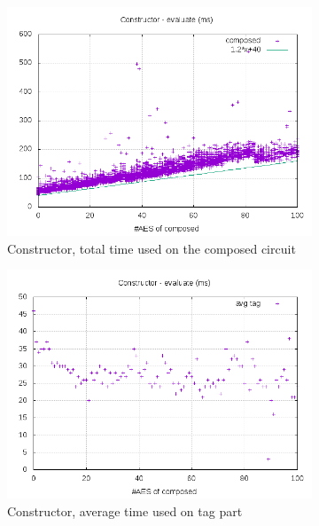 \documentclass[10pt,a4paper]{article}
\begin{document}
\begin{figure}[h]
    \centering
    \begin{subfigure}[t]{0.3\textwidth}
        \includegraphics[width=\textwidth]{const_eval_plots}
        \caption{Constructor, total time used on the composed circuit}
    \end{subfigure}
    \begin{subfigure}[t]{0.3\textwidth}
        \includegraphics[width=\textwidth]{const_eval_avg}
        \caption{Constructor, average time used on tag part}
    \end{subfigure}
    \begin{subfigure}[t]{0.3\textwidth}

\end{subfigure}
\end{figure}
\end{document}
